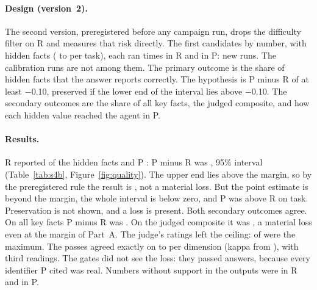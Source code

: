 \paragraph{Design (version~2).} The second version, preregistered before any campaign run, drops the difficulty
filter on R and measures that risk directly. The first \SfourBTasks{} candidates by number, with
\SfourBHiddenFacts{} hidden facts (\SfourBHiddenMin{} to \SfourBHiddenMax{} per task), each ran \SfourBReps{} times
in R and in P: \SfourBRuns{} new runs. The calibration runs are not among them. The primary outcome is the share of
hidden facts that the answer reports correctly. The hypothesis is P minus R of at least $-$0.10, preserved if the
lower end of the interval lies above $-$0.10. The secondary outcomes are the share of all key facts, the judged
composite, and how each hidden value reached the agent in P.

\begin{table}[t]
\centering\small

\caption{Study~4B: billing tasks whose answers need fields the projection removes, \SfourBRunsPerArm{} runs per arm.
Shares of the key's facts reported correctly, scored by script, averaged within task with tasks weighted
equally; composite and dimensions from the blind judge.
Intervals: 95\% bootstrap over tasks. The primary outcome and its interval are in bold.}
\label{tab:s4b}
\end{table}

\paragraph{Results.} R reported \SfourBHiddenR{} of the hidden facts and P \SfourBHiddenP{}: P minus R was
\textbf{\SfourBPoint{}}, 95\% interval \textbf{\SfourBCI{}} (Table~\ref{tab:s4b},
Figure~\ref{fig:quality}). The upper end lies
\SfourBMarginGap{} above the margin, so by the preregistered rule the result is \emph{\SfourBVerdict}, not a
material loss. But the point estimate is beyond the margin, the whole interval is below zero, and P was above R
on \SfourBTasksAbove{} task. Preservation is not shown, and a loss is present. Both secondary outcomes
agree. On all key facts P minus R was \SfourBFactsPoint{} \SfourBFactsCI{}. On the judged composite it was
\SfourBCompositePoint{} \SfourBCompositeCI{}, a material loss even at the margin of Part~A. The judge's ratings left
the ceiling: \SfourBRatingsFour{} of \SfourBRatings{} were the maximum. The passes agreed exactly on \SfourBExactMin{}
to \SfourBExactMax{} per dimension (kappa from \SfourBKappaMin{}), with \SfourBAdjudicated{} third readings. The
gates did not see the loss: they passed \SfourBGates{} answers, because every identifier P cited was real. Numbers
without support in the outputs were \SfourBUnsupportedR{} in R and \SfourBUnsupportedP{} in P.


